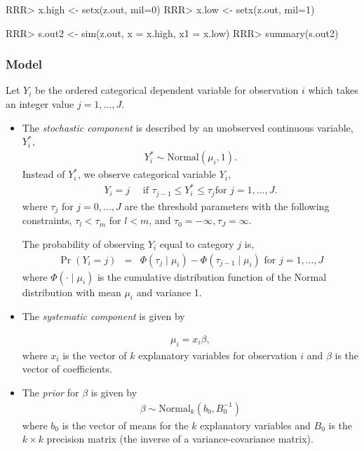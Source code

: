 \begin{enumerate}
\begin{Schunk}
\begin{Sinput}
RRR>  x.high <- setx(z.out, mil=0)
RRR>  x.low <- setx(z.out, mil=1)
\end{Sinput}
\end{Schunk}
\begin{Schunk}
\begin{Sinput}
RRR> s.out2 <- sim(z.out, x = x.high, x1 = x.low)
RRR>  summary(s.out2)
\end{Sinput}
\end{Schunk}
\end{enumerate}

\subsubsection{Model}
Let $Y_{i}$ be the ordered categorical dependent variable for
observation $i$ which takes an integer value $j=1, \ldots, J$.

\begin{itemize}
\item The \emph{stochastic component} is described by an unobserved 
continuous variable, $Y_i^*$, 
\begin{eqnarray*}
Y_{i}^*  \sim \textrm{Normal}(\mu_i, 1).
\end{eqnarray*}
Instead of $Y_i^*$, we observe categorical variable $Y_i$,
\begin{eqnarray*}
Y_i = j \quad \textrm{ if } \tau_{j-1} \le Y_i^* \le \tau_j \textrm{
for } j=1,\ldots, J.
\end{eqnarray*}
where $\tau_j$ for $j=0,\ldots, J$ are the threshold parameters with
the following constraints, $\tau_l < \tau_m$ for $l < m$, and
$\tau_0=-\infty, \tau_J=\infty$.

The probability of observing $Y_i$ equal to category $j$ is,
\begin{eqnarray*}
\Pr(Y_i=j) &=& \Phi(\tau_j \mid \mu_i)-\Phi(\tau_{j-1} \mid \mu_i) 
\textrm{ for } j=1,\ldots, J
\end{eqnarray*}
where $\Phi(\cdot \mid \mu_i)$ is the cumulative distribution function
of the Normal distribution with mean $\mu_i$ and variance 1.

\item The \emph{systematic component} is given by

\begin{eqnarray*}
\mu_{i}= x_i \beta,
\end{eqnarray*}
where $x_{i}$ is the vector of $k$ explanatory variables for 
observation $i$ and $\beta$ is the vector of coefficients.

\item The \emph{prior} for $\beta$ is given by
\begin{eqnarray*}
\beta \sim \textrm{Normal}_k\left(  b_{0},B_{0}^{-1}\right)
\end{eqnarray*}
where $b_{0}$ is the vector of means for the $k$ explanatory variables
and $B_{0}$ is the $k \times k$ precision matrix (the inverse of a
variance-covariance matrix).
\end{itemize}

